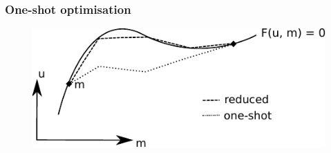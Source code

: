%
%
%
\begin{frame}
    \frametitle{One-shot optimisation}
    \begin{figure}
    \begin{center}
        \includegraphics[width=1.0\textwidth]{pdf/one-shot} 
    \end{center}
    \end{figure}

\end{frame}



